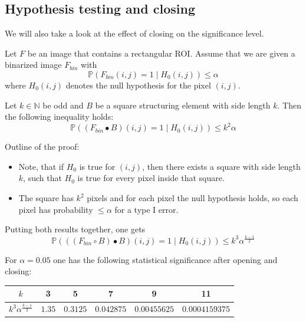 \documentclass{beamer}
\begin{document}
\subsection{Hypothesis testing and closing}

\begin{frame}
	We will also take a look at the effect of closing on the significance level.
	
	\begin{theorem}
		Let $F$ be an image that contains a rectangular ROI. Assume that we are given a binarized image $F_{bin}$ with
		\begin{equation*}
			\mathbb{P}(F_{bin}(i, j) = 1 \mid H_0(i, j)) \leq \alpha
		\end{equation*}
		where $H_0(i, j)$ denotes the null hypothesis for the pixel $(i, j)$.
		
		Let $k \in \mathbb{N}$ be odd and $B$ be a square structuring element with side length $k$. Then the following inequality holds:
		\begin{equation*}
			\mathbb{P}((F_{bin} \bullet B)(i, j) = 1 \mid H_0(i, j)) \leq k^2 \alpha
		\end{equation*}
	\end{theorem}
\end{frame}

\begin{frame}
	Outline of the proof:
	\begin{itemize}
		\item Note, that if $H_0$ is true for $(i, j)$, then there exists a square with side length $k$, such that $H_0$ is true for every pixel inside that square.
		\item The square has $k^2$ pixels and for each pixel the null hypothesis holds, so each pixel has probability $\leq \alpha$ for a type I error.
	\end{itemize}
\end{frame}

\begin{frame}
	Putting both results together, one gets
	\begin{equation*}
		\mathbb{P}(((F_{bin} \circ B) \bullet B)(i, j) = 1 \mid H_0(i, j)) \leq k^3 \alpha^\frac{k - 1}{2}
	\end{equation*}
	
	For $\alpha = 0.05$ one has the following statistical significance after opening and closing:
	
	\begin{tabular}{|c|c|c|c|c|c|}
		\hline
		$k$ & 3 & 5 & 7 & 9 & 11 \\
		\hline
		$k^3 \alpha^\frac{k - 1}{2}$ & $1.35$ & $0.3125$ & $0.042875$ & $0.00455625$ & $0.0004159375$ \\
		\hline
	\end{tabular}
\end{frame}
\end{document}
